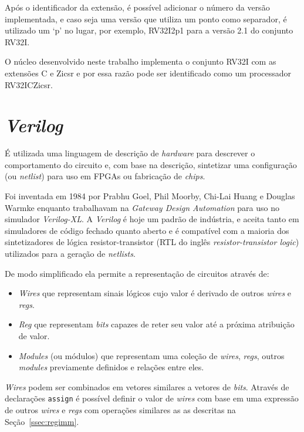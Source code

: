   Após o identificador da extensão, é possível adicionar o número da versão implementada, 
  e caso seja uma versão que utiliza um ponto como separador, 
  é utilizado um `p' no lugar, por exemplo, RV32I2p1 para a versão 2.1
  do conjunto RV32I.

  O núcleo desenvolvido neste trabalho implementa o conjunto RV32I com as extensões C e Zicsr
  e por essa razão pode ser identificado como um processador RV32ICZicsr.

\newpage

\section{\emph{Verilog}}
\label{sec:Verilog}

É utilizada uma linguagem de descrição
de \emph{hardware} para descrever o comportamento do circuito e, com base na descrição, sintetizar
uma configuração (ou \emph{netlist}) para uso em FPGAs ou fabricação de \emph{chips}.

Foi inventada em 1984 por Prabhu Goel, Phil Moorby, Chi-Lai Huang e Douglas Warmke \citep{VEEH}
enquanto trabalhavam na \emph{Gateway Design Automation} para uso no simulador \emph{Verilog-XL}.
A \emph{Verilog} é hoje um padrão de indústria, e aceita tanto em simuladores de código fechado quanto
aberto e é compatível com a maioria dos sintetizadores de lógica resistor-transistor (RTL do inglês
\emph{resistor-transistor logic}) utilizados para a geração de \emph{netlists}.

De modo simplificado ela permite a representação de circuitos através de:
\begin{itemize}
  \item \emph{Wires} que representam sinais lógicos cujo valor é derivado de outros \emph{wires} e \emph{regs}.
  \item \emph{Reg} que representam \emph{bits} capazes de reter seu valor até a próxima atribuição de valor.
  \item \emph{Modules} (ou módulos) que representam uma coleção de \emph{wires}, \emph{regs}, outros \emph{modules} 
        previamente definidos e relações entre eles.
\end{itemize}

\emph{Wires} podem ser combinados em vetores similares a vetores de \emph{bits}.
Através de declarações \texttt{assign} é possível definir o valor de \emph{wires} com base em uma expressão 
de outros \emph{wires} e \emph{regs} com operações similares as as descritas na Seção~\ref{ssec:regimm}.

